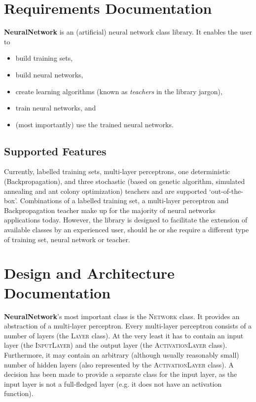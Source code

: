 \section{Requirements Documentation}

\textbf{NeuralNetwork} is an (artificial) neural network class library. It enables the user to
\begin{itemize}
\item build training sets,
\item build neural networks,
\item create learning algorithms (known as \textit{teachers} in the library jargon),
\item train neural networks, and
\item (most importantly) use the trained neural networks.
\end{itemize}

\subsection{Supported Features}

Currently, labelled training sets, multi-layer perceptrons, one deterministic (Backpropagation), and three stochastic (based on genetic algorithm, simulated annealing and ant colony optimization) teachers and are supported `out-of-the-box'. Combinations of a labelled training set, a multi-layer perceptron and Backpropagation teacher make up for the majority of neural networks applications today. However, the library is designed to facilitate the extension of available classes by an experienced user, should he or she require a different type of training set, neural network or teacher.

\section{Design and Architecture Documentation}

\textbf{NeuralNetwork}'s most important class is the \textsc{Network} class. It provides an abstraction of a multi-layer perceptron. Every multi-layer perceptron consists of a number of layers (the \textsc{Layer} class). At the very least it has to contain an input layer (the \textsc{InputLayer}) and the output layer (the \textsc{ActivationLayer} class). Furthermore, it may contain an arbitrary (although usually reasonably small) number of hidden layers (also represented by the \textsc{ActivationLayer} class). A decision has been made to provide a separate class for the input layer, as the input layer is not a full-fledged layer (e.g. it does not have an activation function).

